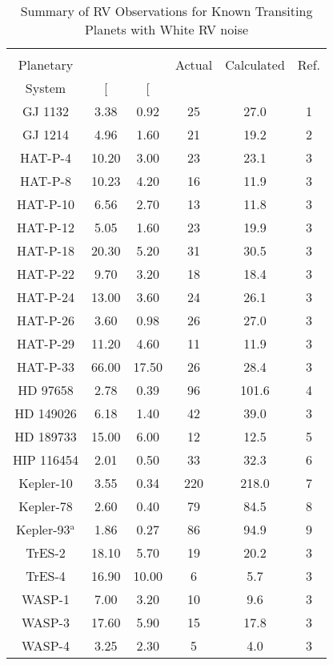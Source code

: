 \begin{table*}
  \small
  \renewcommand{\arraystretch}{0.7}
  \caption{Summary of RV Observations for Known Transiting Planets with White RV noise}
  \label{RVFCtable:compare_white}
  \begin{tabular}{cccccc}
    \hline \\ [-1ex]
    Planetary & \sigeff{} & \sigK{} & Actual & Calculated & Ref. \\ System & [\mps{]} & [\mps{]} & \nrv{} & \nrv{} \\
    \hline
    GJ 1132 & 3.38 & 0.92 & 25 & 27.0 & 1 \\
    GJ 1214 & 4.96 & 1.60 & 21 & 19.2 & 2 \\
    HAT-P-4 & 10.20 & 3.00 & 23 & 23.1 & 3 \\
    HAT-P-8 & 10.23 & 4.20 & 16 & 11.9 & 3 \\
    HAT-P-10 & 6.56 & 2.70 & 13 & 11.8 & 3 \\
    HAT-P-12 & 5.05 & 1.60 & 23 & 19.9 & 3 \\
    HAT-P-18 & 20.30 & 5.20 & 31 & 30.5 & 3 \\
    HAT-P-22 & 9.70 & 3.20 & 18 & 18.4 & 3 \\
    HAT-P-24 & 13.00 & 3.60 & 24 & 26.1 & 3 \\
    HAT-P-26 & 3.60 & 0.98 & 26 & 27.0 & 3 \\
    HAT-P-29 & 11.20 & 4.60 & 11 & 11.9 & 3 \\
    HAT-P-33 & 66.00 & 17.50 & 26 & 28.4 & 3 \\
    HD 97658 & 2.78 & 0.39 & 96 & 101.6 & 4 \\
    HD 149026 & 6.18 & 1.40 & 42 & 39.0 & 3 \\
    HD 189733 & 15.00 & 6.00 & 12 & 12.5 & 5 \\
    HIP 116454 & 2.01 & 0.50 & 33 & 32.3 & 6 \\
    Kepler-10 & 3.55 & 0.34 & 220 & 218.0 & 7 \\
    Kepler-78 & 2.60 & 0.40 & 79 & 84.5 & 8 \\
    Kepler-93$^{\text{a}}$ & 1.86 & 0.27 & 86 & 94.9 & 9 \\
    TrES-2 & 18.10 & 5.70 & 19 & 20.2 & 3 \\
    TrES-4 & 16.90 & 10.00 & 6 & 5.7 & 3 \\
    WASP-1 & 7.00 & 3.20 & 10 & 9.6 & 3 \\
    WASP-3 & 17.60 & 5.90 & 15 & 17.8 & 3 \\
    WASP-4 & 3.25 & 2.30 & 5 & 4.0 & 3 \\

\end{tabular}
\end{table*}
